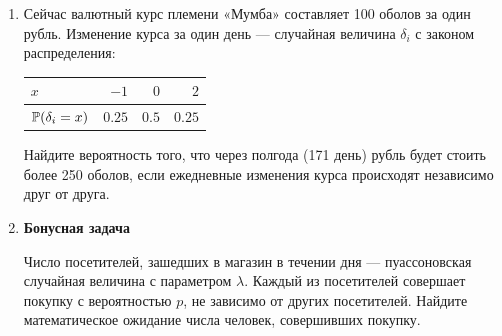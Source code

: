 \begin{enumerate}
\item Сейчас валютный курс племени «Мумба» составляет 100 оболов за один рубль. Изменение курса за один день — случайная величина $\delta_i$ с законом распределения:

\begin{center}
\begin{tabular}{lrrr}
\toprule
$x$ & $-1$ & $0$ & $2$ \\ \midrule
$\P(\delta_i = x)$ & $0.25$ & $0.5$ & $0.25$ \\
\bottomrule
\end{tabular}
\end{center}

Найдите вероятность того, что через полгода (171 день) рубль будет стоить более 250 оболов, если ежедневные изменения курса происходят независимо друг от друга.

\item \textbf{Бонусная задача}

Число посетителей, зашедших в магазин в течении дня — пуассоновская случайная величина с параметром $\lambda$. Каждый из посетителей совершает покупку с вероятностью $p$, не зависимо от других посетителей. Найдите математическое ожидание числа человек, совершивших покупку.

\end{enumerate}

